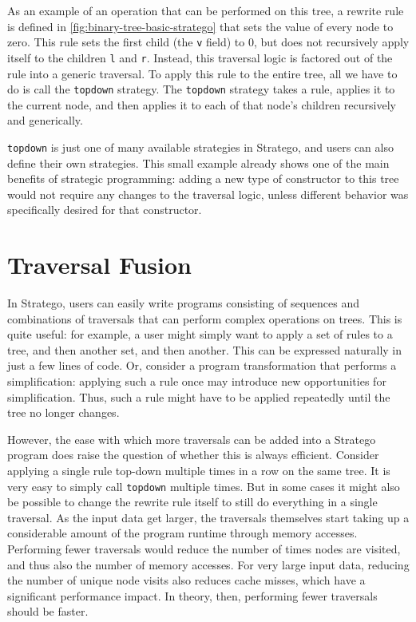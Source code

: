 As an example of an operation that can be performed on this tree, a rewrite rule is defined in \autoref{fig:binary-tree-basic-stratego} that sets the value of every node to zero. This rule sets the first child (the \texttt{v} field) to 0, but does not recursively apply itself to the children \texttt{l} and \texttt{r}. Instead, this traversal logic is factored out of the rule into a generic traversal. To apply this rule to the entire tree, all we have to do is call the \texttt{topdown} strategy. The \texttt{topdown} strategy takes a rule, applies it to the current node, and then applies it to each of that node's children recursively and generically. 

\texttt{topdown} is just one of many available strategies in Stratego, and users can also define their own strategies. This small example already shows one of the main benefits of strategic programming: adding a new type of constructor to this tree would not require any changes to the traversal logic, unless different behavior was specifically desired for that constructor.

\section{Traversal Fusion}
In Stratego, users can easily write programs consisting of sequences and combinations of traversals that can perform complex operations on trees. This is quite useful: for example, a user might simply want to apply a set of rules to a tree, and then another set, and then another. This can be expressed naturally in just a few lines of code. Or, consider a program transformation that performs a simplification: applying such a rule once may introduce new opportunities for simplification. Thus, such a rule might have to be applied repeatedly until the tree no longer changes.

However, the ease with which more traversals can be added into a Stratego program does raise the question of whether this is always efficient. Consider applying a single rule top-down multiple times in a row on the same tree. It is very easy to simply call \texttt{topdown} multiple times. But in some cases it might also be possible to change the rewrite rule itself to still do everything in a single traversal. As the input data get larger, the traversals themselves start taking up a considerable amount of the program runtime through memory accesses. Performing fewer traversals would reduce the number of times nodes are visited, and thus also the number of memory accesses. For very large input data, reducing the number of unique node visits also reduces cache misses, which have a significant performance impact. In theory, then, performing fewer traversals should be faster.

